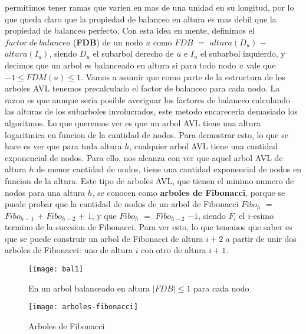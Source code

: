 \documentclass[10pt,a4paper]{article}
\begin{document}
permitimos tener ramas que varien en mas de una unidad en su longitud, por lo que queda claro que la propiedad de balanceo en altura es mas debil que la propiedad de balanceo perfecto. Con esta idea en mente, definimos el $factor~de~balanceo$ (\textbf{FDB}) de un nodo $u$ como
\newline
\newline
$FDB$ $=$ $altura(D_{u})$ $-$ $altura(I_{u})$,
\newline
\newline
siendo $D_{u}$ el subarbol derecho de $u$ e $I_{u}$ el subarbol izquierdo, y decimos que un arbol es balanceado en altura si para todo nodo $u$ vale que $-1 \leq FDM(u) \leq 1$. Vamos a asumir que como parte de la estructura de los arboles AVL tenemos precalculado el factor de balanceo para cada nodo. La razon es que aunque seria posible averiguar los factores de balanceo calculando las alturas de los subarboles involucrados, este metodo encareceria demasiado los algoritmos.
\newline
\newline
Lo que queremos ver es que un arbol AVL tiene una altura logaritmica en funcion de la cantidad de nodos. Para demostrar esto, lo que se hace es ver que para toda altura $h$, cualquier arbol AVL tiene una cantidad exponencial de nodos. Para ello, nos alcanza con ver que aquel arbol AVL de altura $h$ de menor cantidad de nodos, tiene una cantidad exponencial de nodos en funcion de la altura. Este tipo de arboles AVL, que tienen el minimo numero de nodos para una altura $h$, se conocen como \textbf{arboles de Fibonacci}, porque se puede probar que la cantidad de nodos de un arbol de Fibonacci $Fibo_{h}$ $=$ $Fibo_{h-1}$ $+$ $Fibo_{h-2}$ $+$ $1$, y que $Fibo_{h}$ $=$ $Fibo_{h-2}$ $- 1$, siendo $F_{i}$ el $i$-esimo termino de la sucesion de Fibonacci. Para ver esto, lo que tenemos que saber es que se puede construir un arbol de Fibonacci de altura $i+2$ a partir de unir dos arboles de Fibonacci: uno de altura $i$ con otro de altura $i+1$.

\begin{figure}[h]
	\centering
	\texttt{[image: bal1]}
	\caption{En un arbol balanceado en altura $|FDB| \leq 1$ para cada nodo}
	\label{drivers1}
\end{figure}
\newpage
\begin{figure}[h]
	\centering
	\texttt{[image: arboles-fibonacci]}
	\caption{Arboles de Fibonacci}
	\label{drivers1}
\end{figure}
\end{document}
